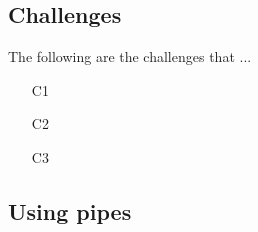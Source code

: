 \subsection{Challenges}
The following are the challenges that ...
\begin{itemize}
	\item [C1] 
	\item [C2] 
	\item [C3] 
\end{itemize}

\subsection{Using pipes} 

